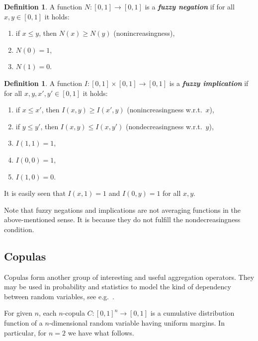 \documentclass[11pt]{article}\usepackage[]{graphicx}\usepackage[]{color}
\renewcommand{\emph}[1]{\textbf{\textsl{#1}}}
\theoremstyle{remark}
\theoremstyle{definition}
\newtheorem{definition}[theorem]{Definition}
\begin{document}
\bigskip
\begin{definition}\label{Def:tnorm}
A function $N: [0,1]\to[0,1]$ is a \emph{fuzzy negation}
if for all $x,y\in[0,1]$ it holds:
\begin{enumerate}
\item if $x \le y$, then $N(x)\ge N(y)$ (nonincreasingness),
\item $N(0)=1$,
\item $N(1)=0$.
\end{enumerate}
\end{definition}




\bigskip
\begin{definition}\label{Def:tnorm}
A function $I: [0,1]\times[0,1]\to[0,1]$ is a \emph{fuzzy implication}
if for all $x,y,x',y'\in[0,1]$ it holds:
\begin{enumerate}
\item if $x \le x'$, then $I(x, y)\ge I(x', y)$ (nonincreasingness w.r.t.~$x$),
\item if $y \le y'$, then $I(x, y)\le I(x, y')$ (nondecreasingness w.r.t.~$y$),
\item $I(1,1)=1$,
\item $I(0,0)=1$,
\item $I(1,0)=0$.
\end{enumerate}
\end{definition}
It is easily seen that $I(x,1)=1$ and $I(0,y)=1$ for all $x,y$.



Note that fuzzy negations and implications are not averaging functions
in the above-mentioned sense. It is
because they do not fulfill the nondecreasingness condition.





\subsection{Copulas}\label{Sec:Copulas}

Copulas form another group of interesting and useful aggregation operators.
They may be used in probability and statistics to model
the kind of dependency between random variables, see e.g.~\cite{Nelsen1999:Copulas}.

For given $n$, each $n$-copula $C:[0,1]^n\to[0,1]$ is a cumulative distribution
function  of a $n$-dimensional random variable
having uniform margins.
In particular, for $n=2$ we have what follows.
\end{document}
